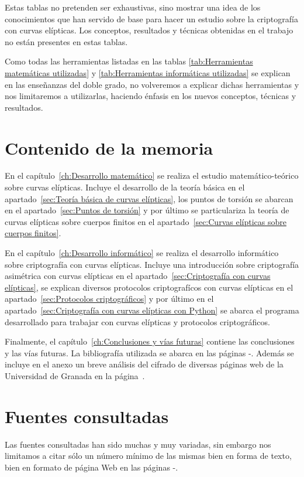Estas tablas no pretenden ser exhaustivas, sino mostrar una idea de los conocimientos que han servido de base para hacer un estudio sobre la criptografía con curvas elípticas. Los conceptos, resultados y técnicas obtenidas en el trabajo no están presentes en estas tablas.

Como todas las herramientas listadas en las tablas \ref{tab:Herramientas matemáticas utilizadas} y \ref{tab:Herramientas informáticas utilizadas} se explican en las enseñanzas del doble grado, no volveremos a explicar dichas herramientas y nos limitaremos a utilizarlas, haciendo énfasis en los nuevos conceptos, técnicas y resultados.


\section{Contenido de la memoria}
\label{sub:Contenido de la memoria}

En el capítulo~\ref{ch:Desarrollo matemático} se realiza el estudio matemático-teórico sobre curvas elípticas. Incluye el desarrollo de la teoría básica en el apartado~\ref{sec:Teoría básica de curvas elípticas}, los puntos de torsión se abarcan en el apartado~\ref{sec:Puntos de torsión} y por último se particulariza la teoría de curvas elípticas sobre cuerpos finitos en el apartado~\ref{sec:Curvas elípticas sobre cuerpos finitos}.

En el capítulo~\ref{ch:Desarrollo informático} se realiza el desarrollo informático sobre criptografía con curvas elípticas. Incluye una introducción sobre criptografía asimétrica con curvas elípticas en el apartado~\ref{sec:Criptografía con curvas elípticas}, se explican diversos protocolos criptografícos con curvas elípticas en el apartado~\ref{sec:Protocolos criptográficos} y por último en el apartado~\ref{sec:Criptografía con curvas elípticas con Python} se abarca el programa desarrollado para trabajar con curvas elípticas y protocolos criptográficos.

Finalmente, el capítulo~\ref{ch:Conclusiones y vías futuras} contiene las conclusiones y las vías futuras. La bibliografía utilizada se abarca en las páginas \pageref{app:bibliography}-\pageref{app:bibliography end}. Además se incluye en el anexo un breve análisis del cifrado de diversas páginas web de la Universidad de Granada en la página~\pageref{ap:apendice}.


\section{Fuentes consultadas}
\label{sub:Principales fuentes}

Las fuentes consultadas han sido muchas y muy variadas, sin embargo nos limitamos a citar sólo un número mínimo de las mismas bien en forma de texto, bien en formato de página Web en las páginas \pageref{app:bibliography}-\pageref{app:bibliography end}.

